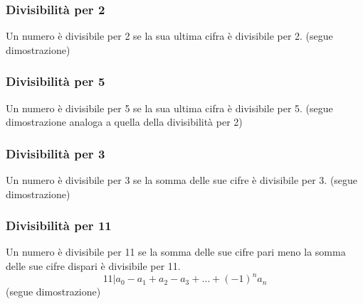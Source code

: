 \begin{flushleft}
\subsubsection{Divisibilità per 2}
Un numero è divisibile per 2 se la sua ultima cifra è divisibile per 2.
(segue dimostrazione)
\\ \vspace{300px}
\subsubsection{Divisibilità per 5}
Un numero è divisibile per 5 se la sua ultima cifra è divisibile per 5.
(segue dimostrazione analoga a quella della divisibilità per 2)
\\ \vspace{300px}
\subsubsection{Divisibilità per 3}
Un numero è divisibile per 3 se la somma delle sue cifre è divisibile per 3.
(segue dimostrazione)
\\ \vspace{300px}
\subsubsection{Divisibilità per 11}
Un numero è divisibile per 11 se la somma delle sue cifre pari meno la somma delle sue cifre dispari è divisibile per 11.
\[11| a_0-a_1+a_2-a_3+\hdots +(-1)^n a_n\]
(segue dimostrazione)
\\ \vspace{300px}






\end{flushleft}
